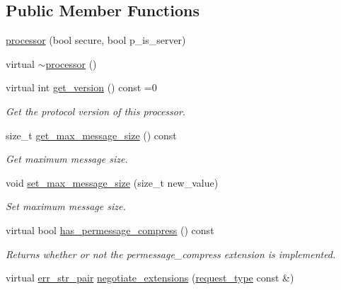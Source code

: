 \subsection*{Public Member Functions}
\begin{DoxyCompactItemize}
\item 
\hyperlink{classwebsocketpp_1_1processor_1_1processor_a7313d1efc0cccc44451c4acabc0e7256}{processor} (bool secure, bool p\+\_\+is\+\_\+server)
\item 
virtual \hyperlink{classwebsocketpp_1_1processor_1_1processor_af0f5fc4da52c89b9d1b1ea1318d2101d}{$\sim$processor} ()
\item 
virtual int \hyperlink{classwebsocketpp_1_1processor_1_1processor_af415ca67d51a90339ce57763b497f834}{get\+\_\+version} () const  =0
\begin{DoxyCompactList}\small\item\em Get the protocol version of this processor. \end{DoxyCompactList}\item 
size\+\_\+t \hyperlink{classwebsocketpp_1_1processor_1_1processor_ac150efa28093c3eabe35b3759bb0a837}{get\+\_\+max\+\_\+message\+\_\+size} () const 
\begin{DoxyCompactList}\small\item\em Get maximum message size. \end{DoxyCompactList}\item 
void \hyperlink{classwebsocketpp_1_1processor_1_1processor_ad412d33b168539dfbfa1d7e89908c5d1}{set\+\_\+max\+\_\+message\+\_\+size} (size\+\_\+t new\+\_\+value)
\begin{DoxyCompactList}\small\item\em Set maximum message size. \end{DoxyCompactList}\item 
virtual bool \hyperlink{classwebsocketpp_1_1processor_1_1processor_a0dbb6e644894c3ecb827b1d396a3f3a9}{has\+\_\+permessage\+\_\+compress} () const 
\begin{DoxyCompactList}\small\item\em Returns whether or not the permessage\+\_\+compress extension is implemented. \end{DoxyCompactList}\item 
virtual \hyperlink{classwebsocketpp_1_1processor_1_1processor_aa17cb49b100ed209ca8650895812be11}{err\+\_\+str\+\_\+pair} \hyperlink{classwebsocketpp_1_1processor_1_1processor_aad69873505ba59f4ddf53e864f32bb80}{negotiate\+\_\+extensions} (\hyperlink{classwebsocketpp_1_1processor_1_1processor_ac3926102ce2422e6b40ccea41e764233}{request\+\_\+type} const \&)

\end{DoxyCompactItemize}
